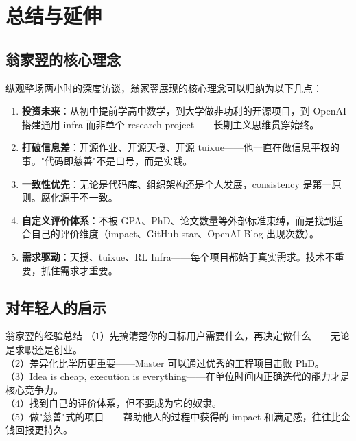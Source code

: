 \section{总结与延伸}

\subsection{翁家翌的核心理念}

纵观整场两小时的深度访谈，翁家翌展现的核心理念可以归纳为以下几点：

\begin{enumerate}
    \item \textbf{投资未来}：从初中提前学高中数学，到大学做非功利的开源项目，到 OpenAI 搭建通用 infra 而非单个 research project——长期主义思维贯穿始终。

    \item \textbf{打破信息差}：开源作业、开源天授、开源 tuixue——他一直在做信息平权的事。"代码即慈善"不是口号，而是实践。

    \item \textbf{一致性优先}：无论是代码库、组织架构还是个人发展，consistency 是第一原则。腐化源于不一致。

    \item \textbf{自定义评价体系}：不被 GPA、PhD、论文数量等外部标准束缚，而是找到适合自己的评价维度（impact、GitHub star、OpenAI Blog 出现次数）。

    \item \textbf{需求驱动}：天授、tuixue、RL Infra——每个项目都始于真实需求。技术不重要，抓住需求才重要。
\end{enumerate}

\subsection{对年轻人的启示}

\begin{importantbox}{翁家翌的经验总结}
（1）先搞清楚你的目标用户需要什么，再决定做什么——无论是求职还是创业。\\
（2）差异化比学历更重要——Master 可以通过优秀的工程项目击败 PhD。\\
（3）Idea is cheap, execution is everything——在单位时间内正确迭代的能力才是核心竞争力。\\
（4）找到自己的评价体系，但不要成为它的奴隶。\\
（5）做"慈善"式的项目——帮助他人的过程中获得的 impact 和满足感，往往比金钱回报更持久。
\end{importantbox}

